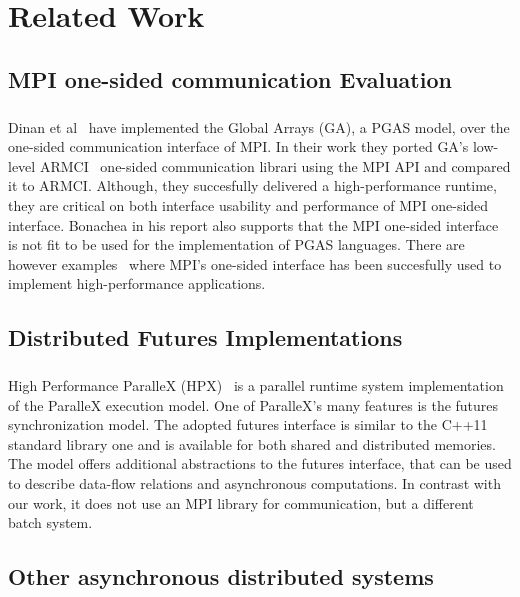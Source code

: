 \chapter{Related Work}
\label{chap:related}

\section{MPI one-sided communication Evaluation}
\paragraph{}
Dinan et al~\cite{Dinan:2012:SGA:2357496.2358660}
have implemented the Global Arrays (GA)\cite{Nieplocha:2006:AAP:1125980.1125985}, a PGAS model, over the one-sided
communication interface of MPI.  In their work they ported GA's low-level ARMCI~\cite{Nieplocha99armci:a} one-sided
communication librari using the MPI API and compared it to ARMCI.  
Although, they succesfully delivered a high-performance runtime, they 
are critical on both interface usability and performance of MPI one-sided interface.  Bonachea in his report
\cite{Bonachea:mpi2} also supports that the MPI one-sided interface is not fit to be used for the implementation 
of PGAS languages.  There are however examples~\cite{A_hydra-mpi:an, Cui:2010:SES:1884643.1884646}
where MPI's one-sided interface has been succesfully used to implement high-performance applications.  

\section{Distributed Futures Implementations}
\paragraph{}
High Performance ParalleX (HPX)~\cite{HPX:TOBE} is a parallel runtime system 
implementation of the ParalleX\cite{Kaiser:2009:PAP:1678991.1679815} 
execution model.  One of ParalleX's many features is the futures synchronization model.
The adopted futures interface is similar to the C++11 standard library one and is available for both shared and distributed
memories.  The model offers additional abstractions to the futures interface, that can be used to describe data-flow relations
and asynchronous computations.
In contrast with our work, it does not use an MPI library for communication, but a different batch system.  

\section{Other asynchronous distributed systems}
